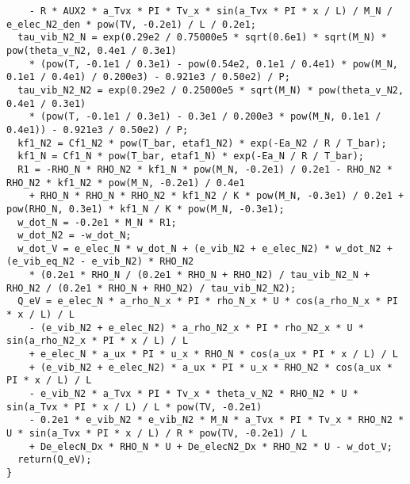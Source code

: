 \documentclass[10pt]{article}
\begin{document}
\begin{scriptsize}
\begin{verbatim}
    - R * AUX2 * a_Tvx * PI * Tv_x * sin(a_Tvx * PI * x / L) / M_N / e_elec_N2_den * pow(TV, -0.2e1) / L / 0.2e1;
  tau_vib_N2_N = exp(0.29e2 / 0.75000e5 * sqrt(0.6e1) * sqrt(M_N) * pow(theta_v_N2, 0.4e1 / 0.3e1) 
    * (pow(T, -0.1e1 / 0.3e1) - pow(0.54e2, 0.1e1 / 0.4e1) * pow(M_N, 0.1e1 / 0.4e1) / 0.200e3) - 0.921e3 / 0.50e2) / P;
  tau_vib_N2_N2 = exp(0.29e2 / 0.25000e5 * sqrt(M_N) * pow(theta_v_N2, 0.4e1 / 0.3e1) 
    * (pow(T, -0.1e1 / 0.3e1) - 0.3e1 / 0.200e3 * pow(M_N, 0.1e1 / 0.4e1)) - 0.921e3 / 0.50e2) / P;
  kf1_N2 = Cf1_N2 * pow(T_bar, etaf1_N2) * exp(-Ea_N2 / R / T_bar);
  kf1_N = Cf1_N * pow(T_bar, etaf1_N) * exp(-Ea_N / R / T_bar);
  R1 = -RHO_N * RHO_N2 * kf1_N * pow(M_N, -0.2e1) / 0.2e1 - RHO_N2 * RHO_N2 * kf1_N2 * pow(M_N, -0.2e1) / 0.4e1 
    + RHO_N * RHO_N * RHO_N2 * kf1_N2 / K * pow(M_N, -0.3e1) / 0.2e1 + pow(RHO_N, 0.3e1) * kf1_N / K * pow(M_N, -0.3e1);
  w_dot_N = -0.2e1 * M_N * R1;
  w_dot_N2 = -w_dot_N;
  w_dot_V = e_elec_N * w_dot_N + (e_vib_N2 + e_elec_N2) * w_dot_N2 + (e_vib_eq_N2 - e_vib_N2) * RHO_N2 
    * (0.2e1 * RHO_N / (0.2e1 * RHO_N + RHO_N2) / tau_vib_N2_N + RHO_N2 / (0.2e1 * RHO_N + RHO_N2) / tau_vib_N2_N2);
  Q_eV = e_elec_N * a_rho_N_x * PI * rho_N_x * U * cos(a_rho_N_x * PI * x / L) / L 
    - (e_vib_N2 + e_elec_N2) * a_rho_N2_x * PI * rho_N2_x * U * sin(a_rho_N2_x * PI * x / L) / L 
    + e_elec_N * a_ux * PI * u_x * RHO_N * cos(a_ux * PI * x / L) / L 
    + (e_vib_N2 + e_elec_N2) * a_ux * PI * u_x * RHO_N2 * cos(a_ux * PI * x / L) / L 
    - e_vib_N2 * a_Tvx * PI * Tv_x * theta_v_N2 * RHO_N2 * U * sin(a_Tvx * PI * x / L) / L * pow(TV, -0.2e1) 
    - 0.2e1 * e_vib_N2 * e_vib_N2 * M_N * a_Tvx * PI * Tv_x * RHO_N2 * U * sin(a_Tvx * PI * x / L) / R * pow(TV, -0.2e1) / L 
    + De_elecN_Dx * RHO_N * U + De_elecN2_Dx * RHO_N2 * U - w_dot_V;
  return(Q_eV);
}
\end{verbatim}
 \end{scriptsize}
\end{document}
